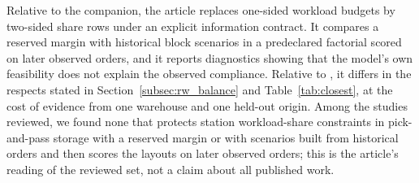 Relative to the companion, the article replaces one-sided workload budgets by two-sided share rows under an explicit information contract. It compares a reserved margin with historical block scenarios in a predeclared factorial scored on later observed orders, and it reports diagnostics showing that the model's own feasibility does not explain the observed compliance. Relative to \citet{winkelmann2025integrated}, it differs in the respects stated in Section~\ref{subsec:rw_balance} and Table~\ref{tab:closest}, at the cost of evidence from one warehouse and one held-out origin. Among the studies reviewed, we found none that protects station workload-share constraints in pick-and-pass storage with a reserved margin or with scenarios built from historical orders and then scores the layouts on later observed orders; this is the article's reading of the reviewed set, not a claim about all published work.
